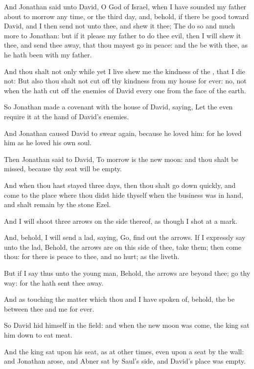 \verse And Jonathan said unto David, O \LORD God of Israel, when I have sounded my father about to morrow any time, or the third day, and, behold, if there be good toward David, and I then send not unto thee, and shew it thee; \verse The \LORD do so and much more to Jonathan: but if it please my father to do thee evil, then I will shew it thee, and send thee away, that thou mayest go in peace: and the \LORD be with thee, as he hath been with my father.

\verse And thou shalt not only while yet I live shew me the kindness of the \LORD, that I die not: \verse But also thou shalt not cut off thy kindness from my house for ever: no, not when the \LORD hath cut off the enemies of David every one from the face of the earth.

\verse So Jonathan made a covenant with the house of David, saying, Let the \LORD even require it at the hand of David's enemies.

\verse And Jonathan caused David to swear again, because he loved him: for he loved him as he loved his own soul.

\verse Then Jonathan said to David, To morrow is the new moon: and thou shalt be missed, because thy seat will be empty.

\verse And when thou hast stayed three days, then thou shalt go down quickly, and come to the place where thou didst hide thyself when the business was in hand, and shalt remain by the stone Ezel.

\verse And I will shoot three arrows on the side thereof, as though I shot at a mark.

\verse And, behold, I will send a lad, saying, Go, find out the arrows.  If I expressly say unto the lad, Behold, the arrows are on this side of thee, take them; then come thou: for there is peace to thee, and no hurt; as the \LORD liveth.

\verse But if I say thus unto the young man, Behold, the arrows are beyond thee; go thy way: for the \LORD hath sent thee away.

\verse And as touching the matter which thou and I have spoken of, behold, the \LORD be between thee and me for ever.

\verse So David hid himself in the field: and when the new moon was come, the king sat him down to eat meat.

\verse And the king sat upon his seat, as at other times, even upon a seat by the wall: and Jonathan arose, and Abner sat by Saul's side, and David's place was empty.

